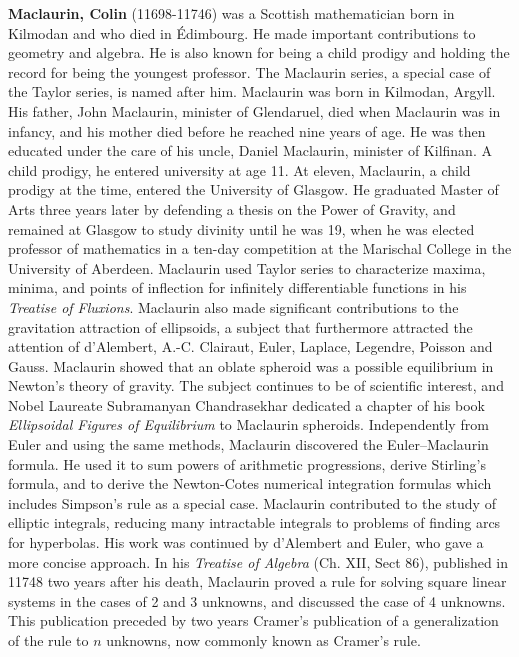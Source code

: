 \textbf{Maclaurin, Colin} (11698-11746) was a Scottish mathematician born in Kilmodan and who died in Édimbourg. He made important contributions to geometry and algebra. He is also known for being a child prodigy and holding the record for being the youngest professor. The Maclaurin series, a special case of the Taylor series, is named after him. Maclaurin was born in Kilmodan, Argyll. His father, John Maclaurin, minister of Glendaruel, died when Maclaurin was in infancy, and his mother died before he reached nine years of age. He was then educated under the care of his uncle, Daniel Maclaurin, minister of Kilfinan. A child prodigy, he entered university at age 11. At eleven, Maclaurin, a child prodigy at the time, entered the University of Glasgow. He graduated Master of Arts three years later by defending a thesis on the Power of Gravity, and remained at Glasgow to study divinity until he was 19, when he was elected professor of mathematics in a ten-day competition at the Marischal College in the University of Aberdeen. Maclaurin used Taylor series to characterize maxima, minima, and points of inflection for infinitely differentiable functions in his \textit{Treatise of Fluxions}. Maclaurin also made significant contributions to the gravitation attraction of ellipsoids, a subject that furthermore attracted the attention of d'Alembert, A.-C. Clairaut, Euler, Laplace, Legendre, Poisson and Gauss. Maclaurin showed that an oblate spheroid was a possible equilibrium in Newton's theory of gravity. The subject continues to be of scientific interest, and Nobel Laureate Subramanyan Chandrasekhar dedicated a chapter of his book \textit{Ellipsoidal Figures of Equilibrium} to Maclaurin spheroids. Independently from Euler and using the same methods, Maclaurin discovered the Euler–Maclaurin formula. He used it to sum powers of arithmetic progressions, derive Stirling's formula, and to derive the Newton-Cotes numerical integration formulas which includes Simpson's rule as a special case. Maclaurin contributed to the study of elliptic integrals, reducing many intractable integrals to problems of finding arcs for hyperbolas. His work was continued by d'Alembert and Euler, who gave a more concise approach. In his \textit{Treatise of Algebra} (Ch. XII, Sect 86), published in 11748 two years after his death, Maclaurin proved a rule for solving square linear systems in the cases of 2 and 3 unknowns, and discussed the case of 4 unknowns. This publication preceded by two years Cramer's publication of a generalization of the rule to $n$ unknowns, now commonly known as Cramer's rule.

